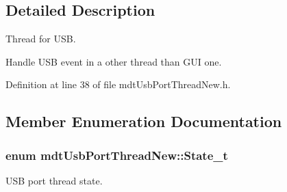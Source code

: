 \subsection{Detailed Description}
Thread for U\-S\-B. 

Handle U\-S\-B event in a other thread than G\-U\-I one. 

Definition at line 38 of file mdt\-Usb\-Port\-Thread\-New.\-h.



\subsection{Member Enumeration Documentation}
\hypertarget{classmdt_usb_port_thread_new_acff06a201f3949a442ee854e45176de9}{
\subsubsection[{State\-\_\-t}]{\setlength{\rightskip}{0pt plus 5cm}enum {\bf mdt\-Usb\-Port\-Thread\-New\-::\-State\-\_\-t}\hspace{0.3cm}{\ttfamily [strong]}}}\label{classmdt_usb_port_thread_new_acff06a201f3949a442ee854e45176de9}


U\-S\-B port thread state. 

